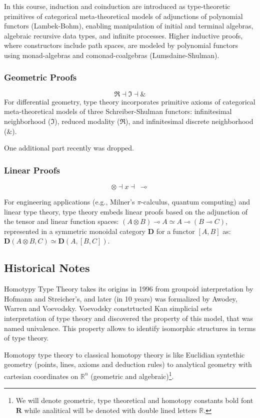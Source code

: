 \documentclass{article}
\theoremstyle{definition}
\begin{document}
In this course, induction and coinduction are introduced as type-theoretic
primitives of categorical meta-theoretical models of adjunctions of
polynomial functors (Lambek-Bohm), enabling manipulation of initial
and terminal algebras, algebraic recursive data types, and infinite
processes. Higher inductive proofs, where constructors include path
spaces, are modeled by polynomial functors using monad-algebras and
comonad-coalgebras (Lumsdaine-Shulman).

\subsubsection{Geometric Proofs}
$$
\Re \dashv \Im \dashv \&
$$
For differential geometry, type theory incorporates primitive axioms of
categorical meta-theoretical models of three Schreiber-Shulman functors:
infinitesimal neighborhood (\(\Im\)), reduced modality (\(\Re\)), and
infinitesimal discrete neighborhood (\(\&\)).

\newpage
One additional part recently was dropped.

\subsubsection{Linear Proofs}

$$
\otimes \dashv x \dashv\ \multimap
$$

For engineering applications (e.g., Milner's $\pi$-calculus, quantum computing)
and linear type theory, type theory embeds linear proofs based on the adjunction
of the tensor and linear function spaces: $(A \otimes B) \multimap A \simeq A \multimap (B \multimap C)$,
represented in a symmetric monoidal category $\mathbf{D}$ for a functor $[A,B]$ as:
$\mathbf{D}(A \otimes B, C) \simeq \mathbf{D}(A, [B,C])$.

\subsection*{Historical Notes}
Homotypy Type Theory takes its origins in 1996 from groupoid interpretation by
Hofmann and Streicher's, and later (in 10 years) was formalized by Awodey,
Warren and Voevodsky. Voevodsky constrtucted Kan simplicial sets interpretation
of type theory and discovered the property of this model, that was named univalence.
This property allows to identify isomorphic structures in terms of type theory.

Homotopy type theory to classical homotopy theory is like Euclidian
syntethic geometry (points, lines, axioms and deduction rules) to
analytical geometry with cartesian coordinates on $\mathbb{R}^n$ (geometric and algebraic)\footnote{We will denote geometric, type theoretical and homotopy constants
bold font $\mathbf{R}$ while analitical will be denoted with double lined letters $\mathbb{R}$.}.
\end{document}
